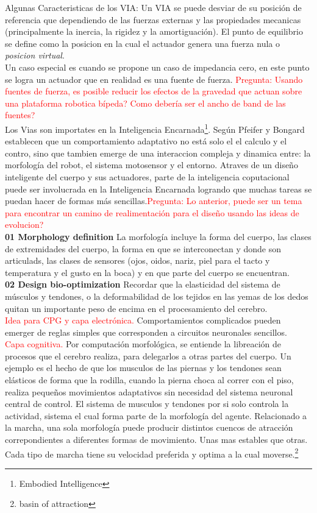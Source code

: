 \documentclass[10pt,onecolumn,twoside,letterpaper]{article}
\begin{document}
Algunas Caracteristicas de los VIA: Un VIA se puede desviar de su posici\'on de referencia que dependiendo de las fuerzas externas y las propiedades mecanicas (principalmente la inercia, la rigidez y la amortiguaci\'on). El punto de equilibrio se define como la posicion en la cual el actuador genera una fuerza nula o \emph{posicion virtual}.\cite{Vanderborght2013}\\
Un caso especial es cuando se propone un caso de impedancia cero, en este punto se logra un actuador que en realidad es una fuente de fuerza. \textcolor{red}{Pregunta: Usando fuentes de fuerza, es posible reducir los efectos de la gravedad que actuan sobre una plataforma robotica b\'ipeda? Como deber\'ia ser el ancho de band de las fuentes?}\\
Los Vias son importates en la Inteligencia Encarnada\footnote{Embodied Intelligence}. Seg\'un Pfeifer y Bongard establecen que un comportamiento adaptativo no est\'a solo el el calculo y el contro, sino que tambien emerge de una interaccion compleja y dinamica entre: la morfolog\'ia del robot, el sistema motosensor y el entorno. Atraves de un dise\~no inteligente del cuerpo y sus actuadores, parte de la inteligencia coputacional puede ser involucrada en la Inteligencia Encarnada logrando que muchas tareas se puedan hacer de formas m\'as sencillas.\textcolor{red}{Pregunta: Lo anterior, puede ser un tema para encontrar un camino de realimentaci\'on para el dise\~no usando las ideas de evolucion?}\cite{Vanderborght2013,Pfeifer2007}\\
\textbf{01 Morphology definition} La morfolog\'ia incluye la forma del cuerpo, las clases de extremidades del cuerpo, la forma en que se interconectan y donde son articulads, las clases de sensores (ojos, oidos, nariz, piel para el tacto y temperatura y el gusto en la boca) y en que parte del cuerpo se encuentran\cite{Pfeifer2007}.\\
\textbf{02 Design bio-optimization} Recordar que la elasticidad del sistema de m\'usculos y tendones, o la deformabilidad de los tejidos en las yemas de los dedos quitan un importante peso de encima en el procesamiento del cerebro.\cite{Pfeifer2007}\\
\textcolor{red}{Idea para CPG y capa electr\'onica.} Comportamientos complicados pueden emerger de reglas simples que corresponden a circuitos neuronales sencillos.\cite{Pfeifer2007}\\
\textcolor{red}{Capa cognitiva.} Por computaci\'on morfol\'ogica, se entiende la libreaci\'on de procesos que el cerebro realiza, para delegarlos a otras partes del cuerpo. Un ejemplo es el hecho de que los musculos de las piernas y los tendones sean el\'asticos de forma que la rodilla, cuando la pierna choca al correr con el piso, realiza peque\~nos movimientos adaptativos sin necesidad del sistema neuronal central de control. El sistema de musculos y tendones por si solo controla la actividad, sistema el cual forma parte de la morfolog\'ia del agente. Relacionado a la marcha, una sola morfolog\'ia puede producir distintos cuencos de atracci\'on correpondientes a diferentes formas de movimiento. Unas mas estables que otras. Cada tipo de marcha tiene su velocidad preferida y optima a la cual moverse.\footnote{basin of attraction}\cite{Pfeifer2007}\\
\end{document}
